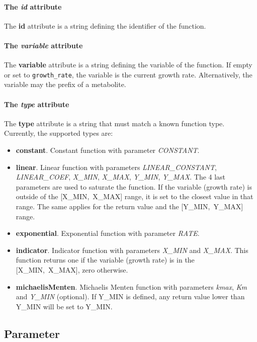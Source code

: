 \paragraph{The \textit{id} attribute}
The \textbf{id} attribute is a string defining the identifier of the function.

\paragraph{The \textit{variable} attribute}
The \textbf{variable} attribute is a string defining the variable of the function.
If empty or set to \texttt{growth\_rate}, the variable is the current growth rate.
Alternatively, the variable may the prefix of a metabolite.

\paragraph{The \textit{type} attribute}
The \textbf{type} attribute is a string that must match a known function type.
Currently, the supported types are:
\begin{itemize}
  \item \textbf{constant}.
  Constant function with parameter
  \textit{CONSTANT}.
  \item \textbf{linear}.
  Linear function with parameters
  \textit{LINEAR\_CONSTANT}, \textit{LINEAR\_COEF},
  \textit{X\_MIN}, \textit{X\_MAX}, \textit{Y\_MIN}, \textit{Y\_MAX}.
  The 4 last parameters are used to saturate the function.
  If the variable (growth rate) is outside of the [X\_MIN,~X\_MAX] range,
  it is set to the closest value in that range.
  The same applies for the return value and the [Y\_MIN,~Y\_MAX] range.
  \item \textbf{exponential}.
  Exponential function with parameter \textit{RATE}.
  \item \textbf{indicator}.
  Indicator function with parameters
  \textit{X\_MIN} and \textit{X\_MAX}.
  This function returns one if the variable (growth rate) is in the
  [X\_MIN,~X\_MAX], zero otherwise.
  \item \textbf{michaelisMenten}.
  Michaelis Menten function with parameters
  \textit{kmax}, \textit{Km} and \textit{Y\_MIN} (optional).
  If Y\_MIN is defined, any return value lower than Y\_MIN will be set to
  Y\_MIN.\@
\end{itemize}


\subsection{Parameter}
\label{sec:parameter}

